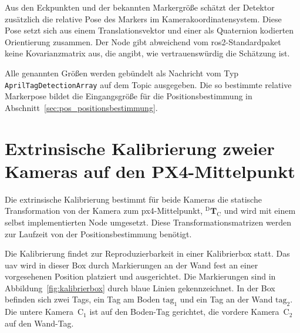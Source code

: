 Aus den Eckpunkten und der bekannten Markergröße schätzt der Detektor zusätzlich die relative Pose des Markers im Kamerakoordinatensystem.
Diese Pose setzt sich aus einem Translationsvektor und einer als Quaternion kodierten Orientierung zusammen. 
Der Node gibt abweichend vom \gls{ros2}-Standardpaket keine Kovarianzmatrix aus, die angibt, wie vertrauenswürdig die Schätzung ist.

Alle genannten Größen werden gebündelt als Nachricht vom Typ \texttt{AprilTagDetectionArray} auf dem Topic  ausgegeben.
Die so bestimmte relative Markerpose bildet die Eingangsgröße für die Positionsbestimmung in Abschnitt~\ref{sec:pos_positionsbestimmung}.




\section{Extrinsische Kalibrierung zweier Kameras auf den PX4-Mittelpunkt}
\label{subsec:extrinsische_kalibrierung_2}
Die extrinsische Kalibrierung bestimmt für beide Kameras die statische Transformation von der Kamera zum \gls{px4}-Mittelpunkt,
$^{\mathrm{D}}\mathbf{T}_{\mathrm{C}}$ und wird mit einem selbst implementierten Node umgesetzt.
Diese Transformationsmatrizen werden zur Laufzeit von der Positionsbestimmung benötigt.

Die Kalibrierung findet zur Reproduzierbarkeit in einer Kalibrierbox statt.
Das \gls{uav} wird in dieser Box durch Markierungen an der Wand fest an einer vorgesehenen Position platziert und ausgerichtet.
Die Markierungen sind in Abbildung~\ref{fig:kalibrierbox} durch blaue Linien gekennzeichnet.
In der Box befinden sich zwei Tags, ein Tag am Boden $\mathrm{tag}_1$ und ein Tag an der Wand $\mathrm{tag}_2$.
Die untere Kamera~$\mathrm{C}_1$ ist auf den Boden-Tag gerichtet, die vordere Kamera~$\mathrm{C}_2$ auf den Wand-Tag.

